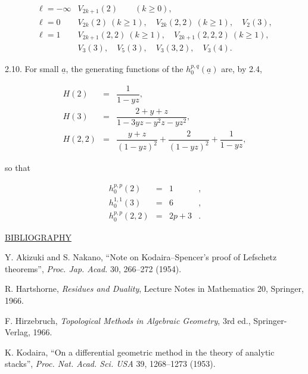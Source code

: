 
\begin{equation*}
\begin{array}{ll}
\ell=-\infty & V_{2k+1}(2) \qquad (k\geq0),\\[2ex]
\ell=0 & V_{2k}(2)\ (k\geq1),\quad
          V_{2k}(2,2)\ (k\geq1),\quad V_2(3),\\[2ex]
\ell=1 & V_{2k+1}(2,2)\ (k\geq1),\quad
          V_{2k+1}(2,2,2)\ (k\geq1),\\
& V_3(3),\quad V_5(3),\quad V_3(3,2),\quad V_3(4).
\end{array}
\end{equation*}

2.10. For small $\underline a$, the generating functions of the
$h_0^{p,q}(\underline a)$ are, by 2.4,

\begin{equation*}
\begin{array}{rcl}
H(2)&=&\dfrac{1}{1-yz},\\[3ex]
H(3)&=&\dfrac{2+y+z}{1-3yz-y^2z-yz^2},\\[3ex]
H(2,2)&=&\dfrac{y+z}{(1-yz)^2}
          +\dfrac{2}{(1-yz)^2}+\dfrac{1}{1-yz},
\end{array}
\end{equation*}

so that

\begin{equation*}
\begin{array}{rcll}
h_0^{p,p}(2)&=&1&,\\[2ex]
h_0^{1,1}(3)&=&6&,\\[2ex]
h_0^{p,p}(2,2)&=&2p+3&.
\end{array}
\end{equation*}


\bigskip
\begin{center}
\underline{BIBLIOGRAPHY}
\end{center}

\begin{enumerate}[label={[\arabic*]},leftmargin=3em]
\item Y. Akizuki and S. Nakano, ``Note on Kodaira--Spencer's proof of
Lefschetz theorems'', \emph{Proc. Jap. Acad.} 30, 266--272 (1954).

\item R. Hartshorne, \emph{Residues and Duality}, Lecture Notes in
Mathematics 20, Springer, 1966.

\item F. Hirzebruch, \emph{Topological Methods in Algebraic Geometry},
3rd ed., Springer-Verlag, 1966.

\item K. Kodaira, ``On a differential geometric method in the theory of
analytic stacks'', \emph{Proc. Nat. Acad. Sci. USA} 39, 1268--1273
(1953).
\end{enumerate}
